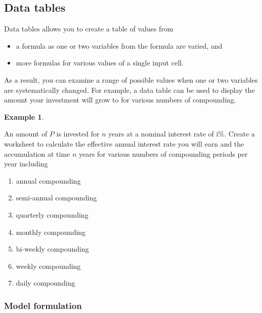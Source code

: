 \documentclass[
]{article}
\theoremstyle{definition}
\theoremstyle{definition}
\newtheorem{example}{Example}[section]
\theoremstyle{definition}
\theoremstyle{definition}
\theoremstyle{remark}
\begin{document}
\hypertarget{data-tables}{%
\subsection{Data tables}\label{data-tables}}

Data tables allows you to create a table of values from

\begin{itemize}
\item
  a formula as one or two variables from the formula are varied, and
\item
  more formulas for various values of a single input cell.
\end{itemize}

As a result, you can examine a range of possible values when one or two
variables are systematically changed. For example, a data table can be
used to display the amount your investment will grow to for various
numbers of compounding.

\begin{example}
\protect\hypertarget{exm:unlabeled-div-11}{}\label{exm:unlabeled-div-11}

An amount of \(P\) is invested for \(n\) years at a nominal interest rate of
i\%. Create a worksheet to calculate the effective annual interest rate
you will earn and the accumulation at time \(n\) years for various numbers
of compounding periods per year including

\begin{enumerate}
\def\labelenumi{\arabic{enumi}.}
\item
  annual compounding
\item
  semi-annual compounding
\item
  quarterly compounding
\item
  monthly compounding
\item
  bi-weekly compounding
\item
  weekly compounding
\item
  daily compounding
\end{enumerate}

\end{example}

\hypertarget{model-formulation}{%
\subsubsection*{Model formulation}\label{model-formulation}}
\end{document}
